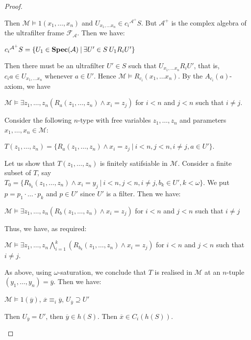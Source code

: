 \documentclass{article}
\theoremstyle{defin}
\theoremstyle{theorem}
\theoremstyle{claim}
\theoremstyle{prop}
\theoremstyle{lemma}
\theoremstyle{fact}
\theoremstyle{remark}
\theoremstyle{ex}
\theoremstyle{col}
\theoremstyle{question}
\begin{document}
\begin{proof}
\begin{enumerate}
Then $\mathcal{M} \models 1(x_1, \dots, x_n)$ and $U_{x_1, \dots x_n} \in c_i{^{\mathcal{A}^{+}}} S$. But $\mathcal{A}^{+}$ is the complex algebra of the ultrafilter frame $\mathcal{F}_{\mathcal{A}}$.
Then we have:
\begin{center}
$c_i{^{\mathcal{A}^{+}}} S = \{ U_1 \in {\bf Spec}(\mathcal{A}) \: | \: \exists U' \in S  \: U_1 R_{i} U' \}$
\end{center}
Then there must be an ultrafilter $U' \in S$ such that $U_{x_1, \dots x_n} R_{i} U'$, that is, $c_i a \in U_{x_1, \dots x_n}$ whenever $a \in U'$.
Hence $\mathcal{M} \models R_{c_i}(x_1, \dots x_n)$. By the $A_{c_i}(a)$-axiom, we have
\begin{center}
$\mathcal{M} \models \exists z_1, \dots, z_n (R_a(z_1, \dots, z_n) \land x_i = z_j)$ for $i < n$ and $j < n$ such that $i \neq j$.
\end{center}
Consider the following $n$-type with free variables $z_1, \dots, z_n$ and parameters $x_1, \dots, x_n \in \mathcal{M}$:
\begin{center}
$T(z_1, \dots, z_n) = \{ R_a(z_1, \dots, z_n) \land x_i = z_j \: | \: i < n, j < n, i \neq j, a \in U' \}$.
\end{center}
Let us show that $T(z_1, \dots, z_n)$ is finitely satifsiable in $\mathcal{M}$.
Consider a finite subset of $T$, say $T_0 = \{ R_{b_k}(z_1, \dots, z_n) \land x_i = y_j \: | \: i < n, j < n, i \neq j, b_k \in U', k < \omega \}$.
We put $p = p_1 \cdot \dots \cdot p_k$ and $p \in U'$ since $U'$ is a filter. Then we have:
\begin{center}
$\mathcal{M} \models \exists z_1, \dots, z_n (R_b(z_1, \dots, z_n) \land x_i = z_j)$ for $i < n$ and $j < n$ such that $i \neq j$
\end{center}
Thus, we have, as required:
\begin{center}
$\mathcal{M} \models \exists z_1, \dots, z_n \bigwedge \limits_{i = 1}^{k} (R_{b_k}(z_1, \dots, z_n) \land x_i = z_j)$ for $i < n$ and $j < n$ such that $i \neq j$.
\end{center}
As above, using $\omega$-saturation, we conclude that $T$ is realised in $\mathcal{M}$ at an $n$-tuple $(y_1, \dots, y_n) = \overline{y}$.
Then we have:
\begin{center}
$\mathcal{M} \models 1(\overline{y})$, $\overline{x} \equiv_i \overline{y}$, $U_{\overline{y}} \supseteq U'$
\end{center}
Then $U_{\overline{y}} = U'$, then $\overline{y} \in h(S)$. Then $\overline{x} \in C_i (h (S))$.


\end{enumerate}
\end{proof}
\end{document}
